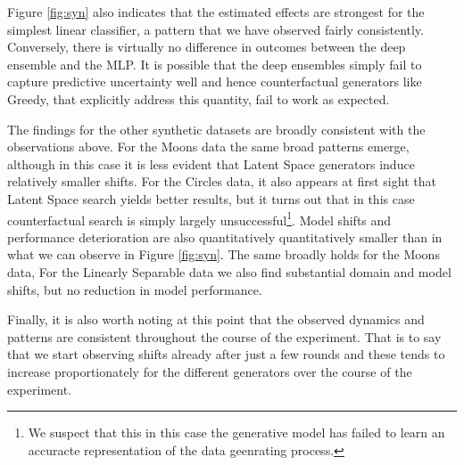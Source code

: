 \documentclass[conference,final,]{IEEEtran}
\theoremstyle{definition}
\theoremstyle{definition}
\theoremstyle{definition}
\theoremstyle{definition}
\theoremstyle{remark}
\begin{document}
Figure \ref{fig:syn} also indicates that the estimated effects are strongest for the simplest linear classifier, a pattern that we have observed fairly consistently. Conversely, there is virtually no difference in outcomes between the deep ensemble and the MLP. It is possible that the deep ensembles simply fail to capture predictive uncertainty well and hence counterfactual generators like Greedy, that explicitly address this quantity, fail to work as expected.

The findings for the other synthetic datasets are broadly consistent with the observations above. For the Moons data the same broad patterns emerge, although in this case it is less evident that Latent Space generators induce relatively smaller shifts. For the Circles data, it also appears at first sight that Latent Space search yields better results, but it turns out that in this case counterfactual search is simply largely unsuccessful\footnote{We suspect that this in this case the generative model has failed to learn an accuracte representation of the data geenrating process.}. Model shifts and performance deterioration are also quantitatively quantitatively smaller than in what we can observe in Figure \ref{fig:syn}. The same broadly holds for the Moons data, For the Linearly Separable data we also find substantial domain and model shifts, but no reduction in model performance.

Finally, it is also worth noting at this point that the observed dynamics and patterns are consistent throughout the course of the experiment. That is to say that we start observing shifts already after just a few rounds and these tends to increase proportionately for the different generators over the course of the experiment.
\end{document}
